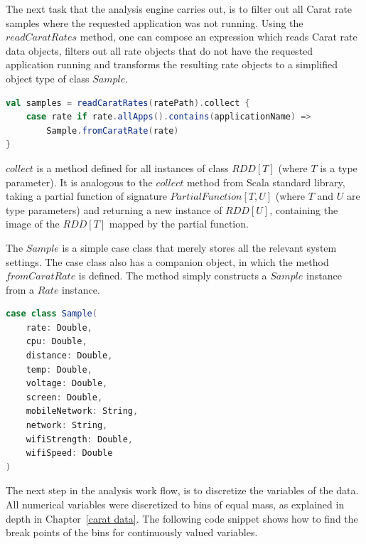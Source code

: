 The next task that the analysis engine carries out, is to filter out all Carat rate samples where the requested application was not running. Using the $readCaratRates$ method, one can compose an expression which reads Carat rate data objects, filters out all rate objects that do not have the requested application running and transforms the resulting rate objects to a simplified object type of class $Sample$. 

\begin{minipage}{0.95\linewidth}
\begin{lstlisting}[language=scala]
val samples = readCaratRates(ratePath).collect {
	case rate if rate.allApps().contains(applicationName) => 
		Sample.fromCaratRate(rate)
}
\end{lstlisting}
\end{minipage}
  
$collect$ is a method defined for all instances of class $RDD[T]$ (where $T$ is a type parameter). It is analogous to the $collect$ method from Scala standard library, taking a partial function of signature $PartialFunction[T, U]$  (where $T$ and $U$ are type parameters) and returning a new instance of $RDD[U]$, containing the image of the $RDD[T]$ mapped by the partial function.
        
The $Sample$ is a simple case class that merely stores all the relevant system settings. The case class also has a companion object, in which the method $fromCaratRate$ is defined. The method simply constructs a $Sample$ instance from a $Rate$ instance. 

\begin{minipage}{0.95\linewidth}
\begin{lstlisting}[language=scala]
case class Sample(
	rate: Double,
	cpu: Double,
	distance: Double,
	temp: Double,
	voltage: Double,
	screen: Double,
	mobileNetwork: String,
	network: String,
	wifiStrength: Double,
	wifiSpeed: Double
)
\end{lstlisting}
\end{minipage}  

The next step in the analysis work flow, is to discretize the variables of the data. All numerical variables were discretized to bins of equal mass, as explained in depth in Chapter~\ref{carat data}. The following code snippet shows how to find the break points of the bins for continuously valued variables.

